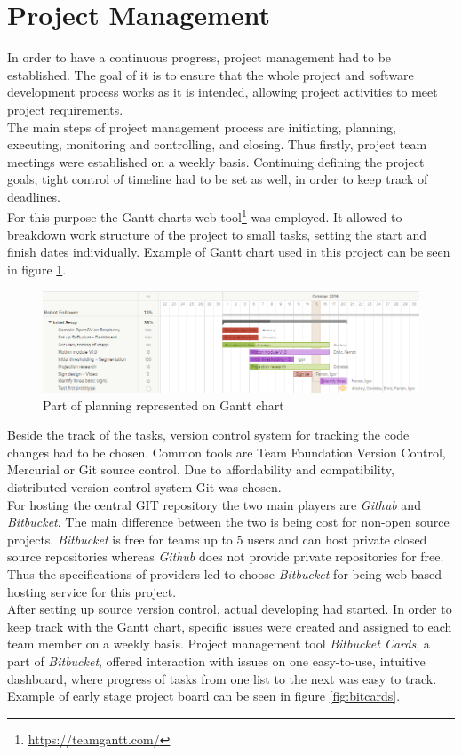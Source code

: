 \documentclass[11pt]{article}
\begin{document}
\section{Project Management}

In order to have a continuous progress, project management had to be established. The goal of it is to ensure that the whole project and software development process works as it is intended, allowing project activities to meet project requirements.
\\
The main steps of project management process are initiating, planning, executing, monitoring and controlling, and closing. Thus firstly, project team meetings were established on a weekly basis. Continuing defining the project goals, tight control of timeline had to be set as well, in order to keep track of deadlines.
\\
For this purpose the Gantt charts web tool\footnote{\url{https://teamgantt.com/}} was employed. It allowed to breakdown work structure of the project to small tasks, setting the start and finish dates individually. Example of Gantt chart used in this project can be seen in figure \ref{fig:gannt_example}.

\begin{figure}[ht!]
	\centering
	\includegraphics[width=1\textwidth]{gantt_chart_part}
	\caption{Part of planning represented on Gantt chart}
	\label{fig:gannt_example}
\end{figure}

Beside the track of the tasks, version control system for tracking the code changes had to be chosen. Common tools are Team Foundation Version Control, Mercurial or Git source control. Due to affordability and compatibility, distributed version control system Git was chosen. 
\\
For hosting the central GIT repository the two main players are \textit{Github} and \textit{Bitbucket}.
The main difference between the two is being cost for non-open source projects. \textit{Bitbucket} is free for teams up to 5 users and can host private closed source repositories whereas \textit{Github} does not provide private repositories for free. Thus the specifications of providers led to choose \textit{Bitbucket} for being web-based hosting service for this project.
\\
After setting up source version control, actual developing had started. In order to keep track with the Gantt chart, specific issues were created and assigned to each team member on a weekly basis. Project management tool \textit{Bitbucket Cards}, a part of \textit{Bitbucket}, offered interaction with issues on one easy-to-use, intuitive dashboard, where progress of tasks from one list to the next was easy to track.  Example of early stage project board can be seen in figure \ref{fig:bitcards}.
\end{document}
